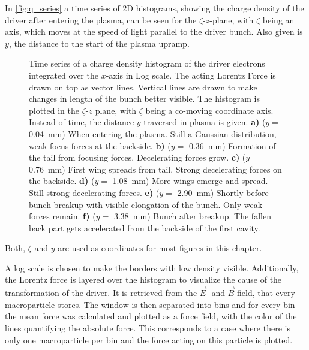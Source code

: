 \documentclass[bachelor_thesis]{subfiles}
\begin{document}
In \autoref{fig:q_series} a time series of 2D histograms, showing the charge density of the driver after entering the plasma, can be seen for the $\zeta$-$z$-plane, with $\zeta$ being an axis, which moves at the speed of light parallel to the driver bunch. Also given is $y$, the distance to the start of the plasma upramp.
\begin{figure}
	\centering
	
	\caption{Time series of a charge density histogram of the driver electrons integrated over the $x$-axis in Log scale. The acting Lorentz Force is drawn on top as vector lines. Vertical lines are drawn to make changes in length of the bunch better visible. 
	The histogram is plotted in the $\zeta$-$z$ plane, with $\zeta$ being a co-moving coordinate axis. Instead of time, the distance $y$ traversed in plasma is given.
	\textbf{a)} ($y=$ \qty{0.04}{mm}) When entering the plasma. Still a Gaussian distribution, weak focus forces at the backside.
	\textbf{b)} ($y=$ \qty{0.36}{mm}) Formation of the tail from focusing forces. Decelerating forces grow.
	\textbf{c)} ($y=$ \qty{0.76}{mm}) First wing spreads from tail. Strong decelerating forces on the backside.
	\textbf{d)} ($y=$ \qty{1.08}{mm}) More wings emerge and spread. Still strong decelerating forces.
	\textbf{e)} ($y=$ \qty{2.90}{mm}) Shortly before bunch breakup with visible elongation of the bunch. Only weak forces remain.
	\textbf{f)} ($y=$ \qty{3.38}{mm}) Bunch after breakup. The fallen back part gets accelerated from the backside of the first cavity.}
	\label{fig:q_series}
\end{figure}
Both, $\zeta$ and $y$ are used as coordinates for most figures in this chapter.

A log scale is chosen to make the borders with low density visible. Additionally, the Lorentz force is layered over the histogram to visualize the cause of the transformation of the driver. It is retrieved from the $\vec{E}$- and $\vec{B}$-field, that every macroparticle stores.
The window is then separated into bins and for every bin the mean force was calculated and plotted as a force field, with the color of the lines quantifying the absolute force. 
This corresponds to a case where there is only one macroparticle per bin and the force acting on this particle is plotted.
\end{document}
